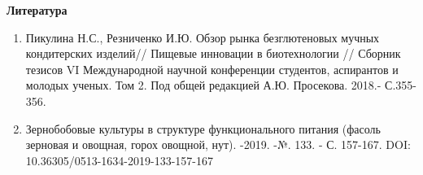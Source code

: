 \begin{center}
{\bfseries Литература}
\end{center}

\begin{references}
\begin{enumerate}
\def\labelenumi{\arabic{enumi}.}
\item
  Пикулина Н.С., Резниченко И.Ю. Обзор рынка безглютеновых мучных
  кондитерских изделий// Пищевые инновации в биотехнологии // Сборник
  тезисов VI Международной научной конференции студентов, аспирантов и
  молодых ученых. Том 2. Под общей редакцией А.Ю. Просекова. 2018.-
  С.355-356.
\item
  Зернобобовые культуры в структуре функционального питания (фасоль
  зерновая и овощная, горох овощной, нут). -2019. -№. 133. - С. 157-167. DOI: 10.36305/0513-1634-2019-133-157-167
\end{enumerate}


\end{references}
